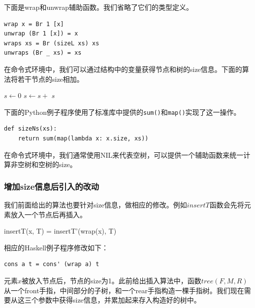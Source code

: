 \documentclass[b5paper]{ctexart}
\begin{document}
下面是wrap和unwrap辅助函数。我们省略了它们的类型定义。

\begin{lstlisting}[style=Haskell]
wrap x = Br 1 [x]
unwrap (Br 1 [x]) = x
wraps xs = Br (sizeL xs) xs
unwraps (Br _ xs) = xs
\end{lstlisting}

在命令式环境中，我们可以通过结构中的变量获得节点和树的size信息。下面的算法将若干节点的size相加。

\begin{algorithmic}
  \State $s \gets 0$
    \State $s \gets s + $ 
  \EndFor
  \State \Return $s$
\EndFunction
\end{algorithmic}

下面的Python例子程序使用了标准库中提供的\texttt{sum()}和\texttt{map()}实现了这一操作。

\lstset{language=Python}
\begin{lstlisting}
def sizeNs(xs):
    return sum(map(lambda x: x.size, xs))
\end{lstlisting}

在命令式环境中，我们通常使用NIL来代表空树，可以提供一个辅助函数来统一计算非空树和空树的size。

\begin{algorithmic}
    \State {}
  \Else
    \State \Return {}
  \EndIf
\EndFunction
\end{algorithmic}

\subsubsection{增加size信息后引入的改动}

我们前面给出的算法也要针对size信息，做相应的修改。例如$insertT$函数会先将元素放入一个节点后再插入。

\be
insertT(x, T) = insertT'(wrap(x), T)
\ee

相应的Haskell例子程序修改如下：

\lstset{language=Haskell}
\begin{lstlisting}[style=Haskell]
cons a t = cons' (wrap a) t
\end{lstlisting}

元素$x$被放入节点后，节点的size为1。此前给出插入算法中，函数$tree(F, M, R)$从一个front手指，中间部分的子树，和一个rear手指构造一棵手指树。我们现在需要从这三个参数中获得size信息，并累加起来存入构造好的树中。
\end{document}

